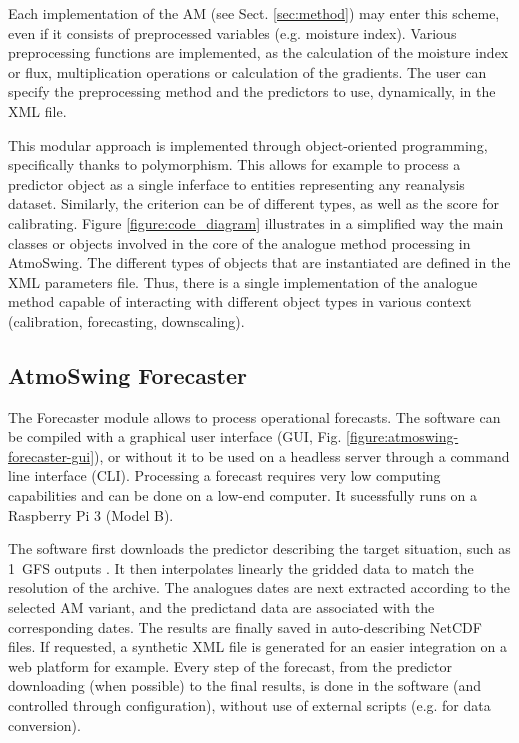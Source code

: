 \documentclass[review]{elsarticle}
\begin{document}
Each implementation of the AM (see Sect. \ref{sec:method}) may enter this scheme, even if it consists of preprocessed variables (e.g. moisture index). Various preprocessing functions are implemented, as the calculation of the moisture index or flux, multiplication operations or calculation of the gradients. The user can specify the preprocessing method and the predictors to use, dynamically, in the XML file.

This modular approach is implemented through object-oriented programming, specifically thanks to polymorphism. This allows for example to process a predictor object as a single inferface to entities representing any reanalysis dataset. Similarly, the criterion can be of different types, as well as the score for calibrating. Figure \ref{figure:code_diagram} illustrates in a simplified way the main classes or objects involved in the core of the analogue method processing in AtmoSwing. The different types of objects that are instantiated are defined in the XML parameters file. Thus, there is a single implementation of the analogue method capable of interacting with different object types in various context (calibration, forecasting, downscaling).


\subsection{AtmoSwing Forecaster}
\label{sec:forecaster}

The Forecaster module allows to process operational forecasts. The software can be compiled with a graphical user interface (GUI, Fig. \ref{figure:atmoswing-forecaster-gui}), or without it to be used on a headless server through a command line interface (CLI). Processing a forecast requires very low computing capabilities and can be done on a low-end computer. It sucessfully runs on a Raspberry Pi 3 (Model B).

The software first downloads the predictor describing the target situation, such as 1\degree\ GFS outputs \citep[Global Forecast System,][see Sect. \ref{sec:data}]{Kanamitsu1991,Kanamitsu1989}. It then interpolates linearly the gridded data to match the resolution of the archive. The analogues dates are next extracted according to the selected AM variant, and the predictand data are associated with the corresponding dates. The results are finally saved in auto-describing NetCDF files. If requested, a synthetic XML file is generated for an easier integration on a web platform for example. Every step of the forecast, from the predictor downloading (when possible) to the final results, is done in the software (and controlled through configuration), without use of external scripts (e.g. for data conversion).
\end{document}
